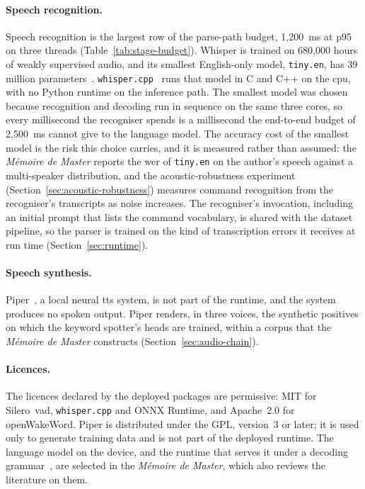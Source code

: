\paragraph{Speech recognition.} Speech recognition is the largest row of the parse-path budget,
1{,}200~ms at p95 on three threads (Table~\ref{tab:stage-budget}). Whisper is trained on 680{,}000
hours of weakly supervised audio, and its smallest English-only model, \texttt{tiny.en}, has 39
million parameters~\cite{whisper}. \texttt{whisper.cpp}~\cite{whispercpp} runs that model in C and
C++ on the \gls{cpu}, with no Python runtime on the inference path. The smallest model was chosen
because recognition and decoding run in sequence on the same three cores, so every millisecond the
recogniser spends is a millisecond the end-to-end budget of 2{,}500~ms cannot give to the language
model. The accuracy cost of the smallest model is the risk this choice carries, and it is measured
rather than assumed: the \emph{M\'emoire de Master} reports the \gls{wer} of \texttt{tiny.en} on the
author's speech against a multi-speaker distribution, and the acoustic-robustness experiment
(Section~\ref{sec:acoustic-robustness}) measures command recognition from the recogniser's
transcripts as noise increases. The recogniser's invocation, including an initial prompt that lists
the command vocabulary, is shared with the dataset pipeline, so the parser is trained on the kind of
transcription errors it receives at run time (Section~\ref{sec:runtime}).

\paragraph{Speech synthesis.} Piper~\cite{piper}, a local neural \gls{tts} system, is not part of
the runtime, and the system produces no spoken output. Piper renders, in three voices, the
synthetic positives on which the keyword spotter's heads are trained, within a corpus that the
\emph{M\'emoire de Master} constructs (Section~\ref{sec:audio-chain}).

\paragraph{Licences.} The licences declared by the deployed packages are permissive: MIT for
Silero~\gls{vad}, \texttt{whisper.cpp} and ONNX Runtime, and Apache~2.0 for openWakeWord. Piper is
distributed under the GPL, version~3 or later; it is used only to generate training data and is not
part of the deployed runtime. The language model on the device, and the runtime that serves it
under a decoding grammar~\cite{llamacpp}, are selected in the \emph{M\'emoire de Master}, which also
reviews the literature on them.

